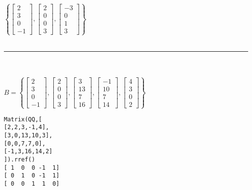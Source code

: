 \documentclass{article}
\begin{document}
{\\
$\left\{ 
\left[\begin{matrix} 2 \\ 3 \\ 0 \\ -1 \end{matrix}\right] , 
\left[\begin{matrix} 2 \\ 0 \\ 0 \\ 3 \end{matrix}\right] , 
\left[\begin{matrix} -3 \\ 0 \\ 1 \\ 3 \end{matrix}\right] 
\right\}$\\
\\
\noindent\rule{8cm}{0.4pt}\\
\\
$B =\left\{ 
\left[\begin{matrix} 2 \\ 3 \\ 0 \\ -1 \end{matrix}\right] , 
\left[\begin{matrix} 2 \\ 0 \\ 0 \\ 3 \end{matrix}\right] , 
\left[\begin{matrix} 3 \\ 13 \\ 7 \\ 16 \end{matrix}\right] , 
\left[\begin{matrix} -1 \\ 10 \\ 7 \\ 14 \end{matrix}\right] ,
\left[\begin{matrix} 4 \\ 3 \\ 0 \\ 2 \end{matrix}\right] 
\right\}$\\
\begin{verbatim}
Matrix(QQ,[
[2,2,3,-1,4],
[3,0,13,10,3],
[0,0,7,7,0],
[-1,3,16,14,2]
]).rref()
[ 1  0  0 -1  1]
[ 0  1  0 -1  1]
[ 0  0  1  1  0]

\end{verbatim}}
\end{document}

